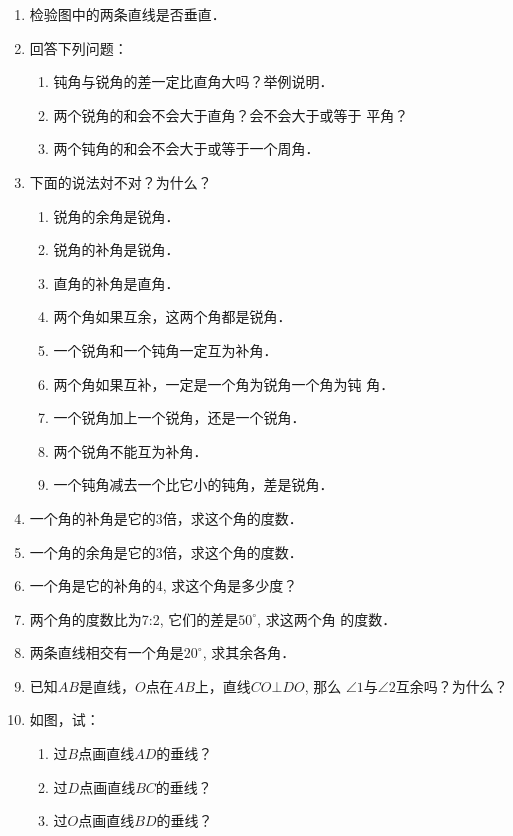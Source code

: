\begin{enumerate}
\item 检验图中的两条直线是否垂直．
\item 回答下列问题：
\begin{enumerate}
\item 钝角与锐角的差一定比直角大吗？举例说明．
\item 两个锐角的和会不会大于直角？会不会大于或等于
平角？
\item 两个钝角的和会不会大于或等于一个周角．
\end{enumerate}

\item 下面的说法対不对？为什么？
\begin{enumerate}
\item 锐角的余角是锐角．
\item 锐角的补角是锐角．
\item 直角的补角是直角．
\item 两个角如果互余，这两个角都是锐角．
\item 一个锐角和一个钝角一定互为补角．
\item 两个角如果互补，一定是一个角为锐角一个角为钝
角．
\item 一个锐角加上一个锐角，还是一个锐角．
\item 两个锐角不能互为补角．
\item 一个钝角减去一个比它小的钝角，差是锐角．
\end{enumerate}

\item 一个角的补角是它的3倍，求这个角的度数．
\item 一个角的余角是它的3倍，求这个角的度数．
\item 一个角是它的补角的4, 求这个角是多少度？
\item 两个角的度数比为7:2, 它们的差是$50^{\circ}$, 求这两个角
的度数．
\item 两条直线相交有一个角是$20^{\circ}$, 求其余各角．
\item 已知$AB$是直线，$O$点在$AB$上，直线$CO\bot DO$, 那么
$\angle 1$与$\angle 2$互余吗？为什么？
\item 如图，试：
\begin{enumerate}
\item 过$B$点画直线$AD$的垂线？
\item 过$D$点画直线$BC$的垂线？
\item 过$O$点画直线$BD$的垂线？
\end{enumerate}


\end{enumerate}
